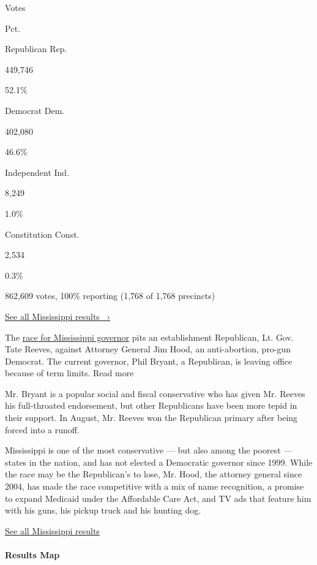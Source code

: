 Votes

Pct.

Republican Rep.

449,746

52.1\%

Democrat Dem.

402,080

46.6\%

Independent Ind.

8,249

1.0\%

Constitution Const.

2,534

0.3\%

862,609 votes, 100\% reporting (1,768 of 1,768 precincts)

\href{https://www.nytimes3xbfgragh.onion/interactive/2019/11/05/us/elections/results-mississippi-general-elections.html}{See
all Mississippi results ~›}

The
\href{https://www.nytimes3xbfgragh.onion/2019/11/05/us/politics/election-day-2019.html}{race
for Mississippi governor} pits an establishment Republican, Lt. Gov.
Tate Reeves, against Attorney General Jim Hood, an anti-abortion,
pro-gun Democrat. The current governor, Phil Bryant, a Republican, is
leaving office because of term limits. Read more

Mr. Bryant is a popular social and fiscal conservative who has given Mr.
Reeves his full-throated endorsement, but other Republicans have been
more tepid in their support. In August, Mr. Reeves won the Republican
primary after being forced into a runoff.

Mississippi is one of the most conservative --- but also among the
poorest --- states in the nation, and has not elected a Democratic
governor since 1999. While the race may be the Republican's to lose, Mr.
Hood, the attorney general since 2004, has made the race competitive
with a mix of name recognition, a promise to expand Medicaid under the
Affordable Care Act, and TV ads that feature him with his guns, his
pickup truck and his hunting dog.

\href{https://www.nytimes3xbfgragh.onion/interactive/2019/11/05/us/elections/results-mississippi-general-elections.html}{See
all Mississippi results }

\hypertarget{results-map}{%
\paragraph{Results Map}\label{results-map}}

